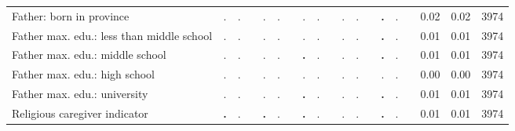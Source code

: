 \begin{tabular}{l c c c c c c c c c c c c c c c c c c}
Father: born in province &         . &         . & &         . &         . & &         . &         . & &         . &         . & & \textbf{        .} &         . & &      0.02 &      0.02 &      3974 \\
Father max. edu.: less than middle school &         . &         . & &         . &         . & &         . &         . & &         . &         . & & \textbf{        .} &         . & &      0.01 &      0.01 &      3974 \\
Father max. edu.: middle school &         . &         . & &         . &         . & & \textbf{        .} &         . & &         . &         . & & \textbf{        .} &         . & &      0.01 &      0.01 &      3974 \\
Father max. edu.: high school &         . &         . & &         . &         . & &         . &         . & &         . &         . & &         . &         . & &      0.00 &      0.00 &      3974 \\
Father max. edu.: university &         . &         . & &         . &         . & & \textbf{        .} &         . & &         . &         . & & \textbf{        .} &         . & &      0.01 &      0.01 &      3974 \\
Religious caregiver indicator & \textbf{        .} &         . & & \textbf{        .} &         . & & \textbf{        .} &         . & &         . &         . & & \textbf{        .} &         . & &      0.01 &      0.01 &      3974 \\
\bottomrule
\end{tabular}
